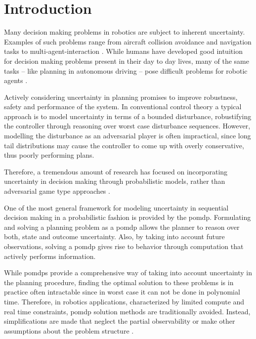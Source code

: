 \chapter{Introduction}\label{chap:introduction}

Many decision making problems in robotics are subject to inherent uncertainty.
Examples of such problems range from aircraft collision avoidance and
navigation tasks to multi-agent-interaction
\cite{kochenderfer2012next}. While humans have developed good
intuition for decision making problems present in their day to day lives, many
of the same tasks -- like planning in autonomous driving -- pose difficult
problems for robotic agents \cite{levinson2011towards}.

Actively considering uncertainty in planning promises to improve robustness,
safety and performance of the system. In conventional control theory a typical approach is to model uncertainty in terms
of a bounded disturbance, robustifying the controller through reasoning over
worst case disturbance sequences. However, modelling the disturbance as an
adversarial player is often impractical, since long tail distributions may
cause the controller to come up with overly conservative, thus poorly
performing plans.

Therefore, a tremendous amount of research has focused on incorporating
uncertainty in decision making through probabilistic models, rather than
adversarial game type approaches \cite{roy1999coastal, amato2015planning,
fisac2018probabilistically, choudhury2019dynamic}.

 One of the most
general framework for modeling uncertainty in sequential decision making in
a probabilistic fashion is provided by the \ac{pomdp}. Formulating and solving
a planning problem as a \ac{pomdp} allows the planner to reason over both,
state and outcome uncertainty. Also, by taking into account future
observations, solving a \ac{pomdp} gives rise to behavior through computation
that actively performs information.

While \acp{pomdp} provide a comprehensive way of taking into account
uncertainty in the planning procedure, finding the optimal solution to these
problems is in practice often intractable since in worst case it can not be
done in polynomial time. Therefore, in robotics applications,
characterized by limited compute and real time constraints, \ac{pomdp} solution
methods are traditionally avoided. Instead, simplifications are made that
neglect the partial observability or make other assumptions about the problem
structure \cite{sadigh2016information, fisac2018probabilistically}.

